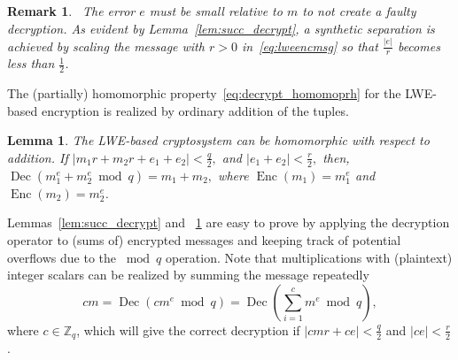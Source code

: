 \documentclass[journal, twoside, web]{ieeecolorpreprint}
\newtheorem{lem}{Lemma}
\newtheorem{rem}{Remark}
\DeclareMathOperator{\enc}{Enc}
\DeclareMathOperator{\dec}{Dec}
\begin{document}

\begin{rem}~\label{rem:roundingerror}
The error $e$ must be small relative to $m$ to not create a faulty decryption. As evident by Lemma~\ref{lem:succ_decrypt}, a synthetic separation is achieved by scaling the message with $r>0$ in~\eqref{eq:lweencmsg} so that $\frac{\vert e\vert }{r}$ becomes less than $\frac{1}{2}$. 
\end{rem}

The (partially) homomorphic property~\eqref{eq:decrypt_homomoprh} for the LWE-based encryption is realized by ordinary addition of the tuples.
\begin{lem}\label{lem:ishomomorphic}
    The LWE-based cryptosystem can be homomorphic with respect to addition. If $\vert m_1r+m_2r+e_1+e_2 \vert < \frac{q}{2},$ and {$\vert {e_1+e_2} \vert <\frac{r}{2},$} then, $\dec(m_1^e+m_2^e \bmod q)= m_1+m_2,$ where $\enc(m_1)=m_1^e$ and $\enc(m_2)= m_2^e$.
\end{lem}

Lemmas~\ref{lem:succ_decrypt} and ~\ref{lem:ishomomorphic} are easy to prove by applying the decryption operator to (sums of) encrypted messages and keeping track of potential overflows due to the $\bmod q$ operation. Note that multiplications with (plaintext) integer scalars can be realized by summing the message repeatedly
\begin{equation*}
    c m = \dec(cm^e \bmod q)=\dec \left( \sum \limits_{i=1}^c m^e \bmod q \right),
\end{equation*}
where $c \in \mathbb Z_q$, which will give the correct decryption if $\vert cmr+ce \vert < \frac{q}{2} $ and $\vert ce \vert < \frac{r}{2}$.
\end{document}
